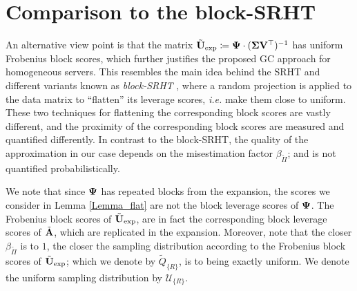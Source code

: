 \documentclass[journal,letterpaper,onecolumn,twoside,nofonttune]{IEEEtran}
\newcommand{\Uu}{\mathcal{U}}
\newcommand{\Ub}{\bold{U}}
\newcommand{\Ubt}{\tilde{\Ub}}
\newcommand{\Vb}{\bold{V}}
\newcommand{\Ab}{\bold{A}}
\newcommand{\Qt}{\tilde{Q}}
\newcommand{\Sigb}{\bold{\Sigma}}
\newcommand{\Abt}{\tilde{\Ab}}
\newcommand{\Pit}{\tilde{\Pi}}
\newcommand{\PsiB}{\bold{\Psi}}
\begin{document}
\section{Comparison to the block-SRHT}
\label{comp_SRHT_app}

An alternative view point is that the matrix $\Ubt_{\mathrm{exp}}\coloneqq\PsiB\cdot(\Sigb\Vb^\top)^{-1}$ has uniform Frobenius block scores, which further justifies the proposed GC approach for homogeneous servers. This resembles the main idea behind the SRHT \cite{AC06,DMMS11} and different variants known as \textit{block-SRHT} \cite{CMPH22,BBGL22}, where a random projection is applied to the data matrix to ``flatten'' its leverage scores, \textit{i.e.} make them close to uniform. These two techniques for flattening the corresponding block scores are vastly different, and the proximity of the corresponding block scores are measured and quantified differently. In contrast to the block-SRHT, the quality of the approximation in our case depends on the misestimation factor $\beta_{\Pit}$; and is not quantified probabilistically.%

We note that since $\PsiB$ has repeated blocks from the expansion, the scores we consider in Lemma \ref{Lemma_flat} are not the block leverage scores of $\PsiB$. The Frobenius block scores of $\Ubt_{\mathrm{exp}}$, are in fact the corresponding block leverage scores of $\Abt$, which are replicated in the expansion. Moreover, note that the closer $\beta_{\Pit}$ is to $1$, the closer the sampling distribution according to the Frobenius block scores of $\Ubt_{\mathrm{exp}}$; which we denote by $\Qt_{\{R\}}$, is to being exactly uniform. We denote the uniform sampling distribution by $\Uu_{\{R\}}$.
\end{document}
